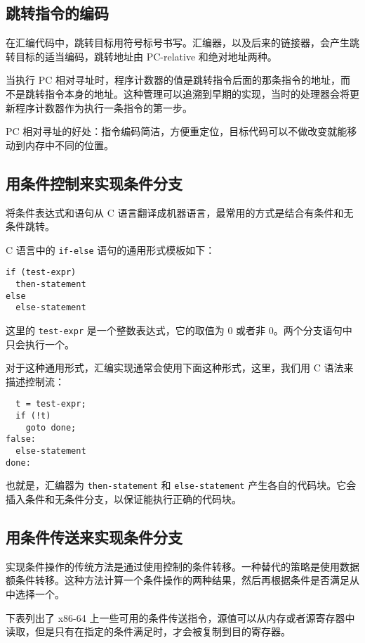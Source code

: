 \subsection{跳转指令的编码}

在汇编代码中，跳转目标用符号标号书写。汇编器，以及后来的链接器，会产生跳转目标的适当编码，跳转地址由 PC-relative 和绝对地址两种。

当执行 PC 相对寻址时，程序计数器的值是跳转指令后面的那条指令的地址，而不是跳转指令本身的地址。这种管理可以追溯到早期的实现，当时的处理器会将更新程序计数器作为执行一条指令的第一步。

PC 相对寻址的好处：指令编码简洁，方便重定位，目标代码可以不做改变就能移动到内存中不同的位置。

\subsection{用条件控制来实现条件分支}

将条件表达式和语句从 C 语言翻译成机器语言，最常用的方式是结合有条件和无条件跳转。

C 语言中的 \verb|if-else| 语句的通用形式模板如下：

\begin{verbatim}
if (test-expr)
  then-statement
else
  else-statement
\end{verbatim}

这里的 \verb|test-expr| 是一个整数表达式，它的取值为 0 或者非 0。两个分支语句中只会执行一个。

对于这种通用形式，汇编实现通常会使用下面这种形式，这里，我们用 C 语法来描述控制流：

\begin{verbatim}
  t = test-expr;
  if (!t)
    goto done;
false:
  else-statement
done:
\end{verbatim}

也就是，汇编器为 \verb|then-statement| 和 \verb|else-statement| 产生各自的代码块。它会插入条件和无条件分支，以保证能执行正确的代码块。

\subsection{用条件传送来实现条件分支}

实现条件操作的传统方法是通过使用控制的条件转移。一种替代的策略是使用数据额条件转移。这种方法计算一个条件操作的两种结果，然后再根据条件是否满足从中选择一个。

下表列出了 x86-64 上一些可用的条件传送指令，源值可以从内存或者源寄存器中读取，但是只有在指定的条件满足时，才会被复制到目的寄存器。

